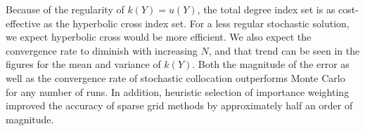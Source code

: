 \documentclass{anstrans}
\begin{document}
Because of the regularity of $k(Y)=u(Y)$, the total degree index set is as cost-effective as the hyperbolic cross index set.  For a less regular stochastic solution, we expect hyperbolic cross would be more efficient.  We also expect the convergence rate to diminish with increasing $N$, and that trend can be seen in the figures for the mean and variance of $k(Y)$. Both the magnitude of the error as well as the convergence rate of stochastic collocation outperforms Monte Carlo for any number of runs.  In addition, heuristic selection of importance weighting improved the accuracy of sparse grid methods by approximately half an order of magnitude.
%
%
  
\end{document}
